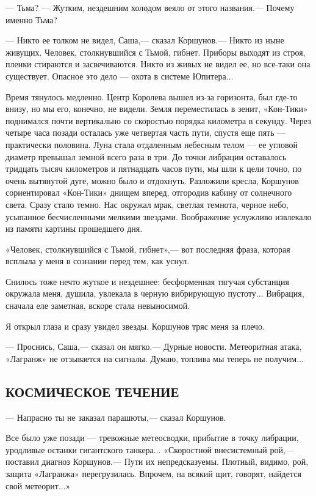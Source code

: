 \documentclass[11pt,a4paper,oneside]{article}
\begin{document}
— Тьма? — Жутким, нездешним холодом веяло от этого названия.— Почему именно Тьма?

— Никто ее толком не видел, Саша,— сказал Коршунов.— Никто из ныне живущих. Человек, столкнувшийся с Тьмой, гибнет. Приборы выходят из строя, пленки стираются и засвечиваются. Никто из живых не видел ее, но все-таки она существует. Опасное это дело — охота в системе Юпитера...

Время тянулось медленно. Центр Королева вышел из-за горизонта, был где-то внизу, но мы его, конечно, не видели. Земля переместилась в зенит, «Кон-Тики» поднимался почти вертикально со скоростью порядка километра в секунду. Через четыре часа позади осталась уже четвертая часть пути, спустя еще пять — практически половина. Луна стала отдаленным небесным телом — ее угловой диаметр превышал земной всего раза в три. До точки либрации оставалось тридцать тысяч километров и пятнадцать часов пути, мы шли к цели точно, по очень вытянутой дуге, можно было и отдохнуть. Разложили кресла, Коршунов сориентировал «Кон-Тики» днищем вперед, отгородив кабину от солнечного света. Сразу стало темно. Нас окружал мрак, светлая темнота, черное небо, усыпанное бесчисленными мелкими звездами. Воображение услужливо извлекало из памяти картины прошедшего дня.

«Человек, столкнувшийся с Тьмой, гибнет»,— вот последняя фраза, которая всплыла у меня в сознании перед тем, как уснул.

Снилось тоже нечто жуткое и нездешнее: бесформенная тягучая субстанция окружала меня, душила, увлекала в черную вибрирующую пустоту... Вибрация, сначала еле заметная, вскоре стала невыносимой.

Я открыл глаза и сразу увидел звезды. Коршунов тряс меня за плечо.

— Проснись, Саша,— сказал он мягко.— Дурные новости. Метеоритная атака, «Лагранж» не отзывается на сигналы. Думаю, топлива мы теперь не получим...

\subsection{КОСМИЧЕСКОЕ ТЕЧЕНИЕ}
\label{cosmic_flow}

— Напрасно ты не заказал парашюты,— сказал Коршунов.

Все было уже позади — тревожные метеосводки, прибытие в точку либрации, уродливые останки гигантского танкера... «Скоростной внесистемный рой,— поставил диагноз Коршунов.— Пути их непредсказуемы. Плотный, видимо, рой, защита «Лагранжа» перегрузилась. Впрочем, на всякий щит, говорят, найдется свой метеорит...»
\end{document}
